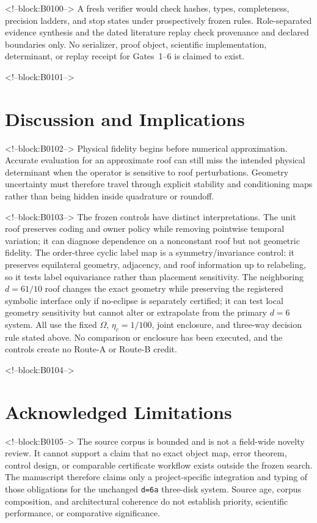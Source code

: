 \documentclass[11pt,a4paper]{article}
\begin{document}
<!--block:B0100-->
A fresh verifier would check hashes, types, completeness, precision ladders,
and stop states under prospectively frozen rules.  Role-separated evidence
synthesis and the dated literature replay check provenance and declared
boundaries only.  No serializer, proof object, scientific implementation,
determinant, or replay receipt for Gates~1--6 is claimed to exist.

<!--block:B0101-->
\section{Discussion and Implications}

<!--block:B0102-->
Physical fidelity begins before numerical approximation. Accurate evaluation for an approximate roof can still miss the intended physical determinant when the operator is sensitive to roof perturbations. Geometry uncertainty must therefore travel through explicit stability and conditioning maps rather than being hidden inside quadrature or roundoff.

<!--block:B0103-->
The frozen controls have distinct interpretations.  The unit roof preserves
coding and owner policy while removing pointwise temporal variation; it can
diagnose dependence on a nonconstant roof but not geometric fidelity.  The
order-three cyclic label map is a symmetry/invariance control: it preserves
equilateral geometry, adjacency, and roof information up to relabeling, so it
tests label equivariance rather than placement sensitivity.  The neighboring
\(d=61/10\) roof changes the exact geometry while preserving the registered
symbolic interface only if no-eclipse is separately certified; it can test local
geometry sensitivity but cannot alter or extrapolate from the primary \(d=6\)
system.  All use the fixed \(\Omega\), \(\eta_c=1/100\), joint enclosure, and
three-way decision rule stated above.  No comparison or enclosure has been
executed, and the controls create no Route-A or Route-B credit.

<!--block:B0104-->
\section{Acknowledged Limitations}

<!--block:B0105-->
The source corpus is bounded and is not a field-wide novelty review. It cannot support a claim that no exact object map, error theorem, control design, or comparable certificate workflow exists outside the frozen search. The manuscript therefore claims only a project-specific integration and typing of those obligations for the unchanged \texttt{d=6a} three-disk system. Source age, corpus composition, and architectural coherence do not establish priority, scientific performance, or comparative significance.
\end{document}

